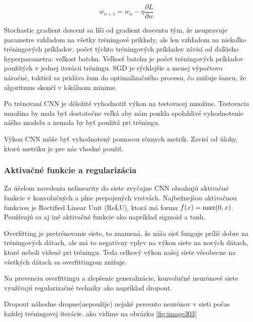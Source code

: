 \begin{equation}
w_{n+1} = w_n - \eta \frac{\partial L}{\partial w} \label{eq:gradient_descent}
\end{equation}

Stochastic gradient descent sa líši od gradient descentu tým, že neupravuje parametre vzhľadom na všetky tréningové príklady, ale len vzhľadom na niekoľko tréningových príkladov, počet týchto tréningových príkladov závisí od ďaľšieho hyperparametra: veľkost batchu. Veľkosť batchu je počet tréningových príkladov použitých v jednej iterácii tréningu. SGD je rýchlejšie a menej výpočtovo náročné, taktiež sa pridáva šum do optimalizačného procesu, čo znižuje šancu, že algoritmus skončí v lokálnom minime. 

Po trénovaní CNN je dôležité vyhodnotiť výkon na testovacej množine. Testovacia množina by mala byť dostatočne veľká aby nám ponkla spolahlivé vyhodnotenie nášho modelu a nemala by byť použitá pri tréningu. 

Výkon CNN môže byť vyhodnotený pomocou rôznych metrík. Zavisí od úlohy, ktorú metriku je pre nás vhodné použiť.


\subsubsection{Aktivačné funkcie a regularizácia}

\hspace{\parindent}Za účelom zavedenia nelinearity do siete zvyčajne CNN obsahujú aktivačné funkcie v konvolučných a plne prepojených vrstvách. Najbežnejšou aktivačnou funkciou je Rectified Linear Unit (ReLU), ktorá má formu $f(x) = \textnormal{max}(0, x)$. Používajú sa aj iné aktivačné funkcie ako napríklad sigmoid a tanh. 

Overfitting je pretrénovanie siete, to znamená, že náša sieť funguje príliš dobre na tréningových dátach, ale má to negatívny vplyv na výkon siete na nových dátach, ktoré neboli videné pri tréningu. Teda celkový výkon našej siete všeobecne na všetkých dátach sa overfittingom znižuje.

Na prevenciu overfittingu a zlepšenie generalizácie, konvolučné neurónové siete využívajú regularizačné techniky ako napríklad dropout. 

Dropout náhodne dropne(nepoužije) nejaké percento neurónov v sieti počas každej tréningovej iterácie. ako vidíme na obrázku \ref{fig:image303}

